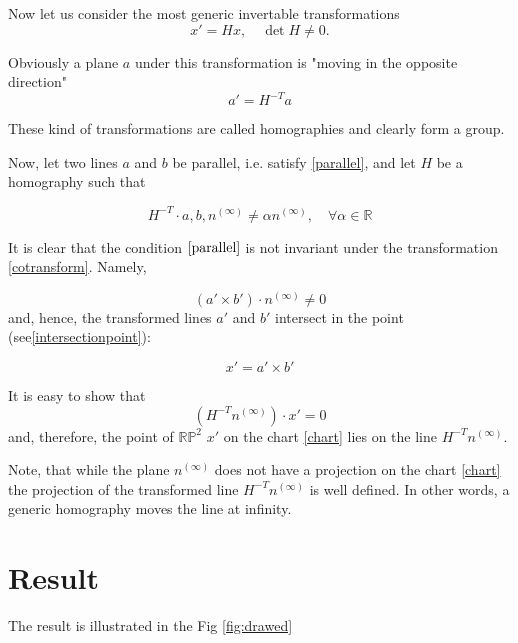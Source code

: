 \documentclass[a4paper,10pt]{article}
\begin{document}
Now let us consider the most generic invertable transformations 
\begin{equation}
x' = H x, \quad \det H \neq 0. 
\end{equation}

Obviously a plane $a$ under this transformation  is "moving in the opposite direction"
\begin{equation}
a'=H^{-T}a\label{cotransform}
\end{equation}

These kind of transformations are called homographies and clearly form a group. 

Now, let two lines $a$ and $b$ be parallel, i.e. satisfy \eqref{parallel},  and let $H$ be a homography such that

\begin{equation}
H^{-T} \cdot a,b,n^{(\infty)}  \neq \alpha n^{(\infty)} , \quad \forall \alpha \in \mathbb{R}
\end{equation}

 It is clear that the condition $\eqref{parallel}$ is not invariant under the transformation \eqref{cotransform}. Namely,

\begin{equation}
(a'\times b')\cdot  n^{(\infty)} \neq 0
\end{equation} 
 and, hence, the transformed lines $a'$ and $b'$ intersect in the point (see\eqref{intersectionpoint}):

\begin{equation}
x' = a' \times b'
\end{equation}

It is easy to show that 
\begin{equation}
(H^{-T}n^{(\infty)}) \cdot x'  = 0
\end{equation}
and, therefore, the point of $\mathbb{RP}^2$ $x'$ on the chart \eqref{chart} lies on the line $H^{-T}n^{(\infty)}$. 

Note, that while the plane $n^{(\infty)}$ does not have a projection on the chart \eqref{chart} the projection of the  transformed line $H^{-T}n^{(\infty)}$ is well defined. In other words, a generic homography moves the line at infinity.


\section{Result}

The result is illustrated in the Fig \ref{fig:drawed}
\end{document}
